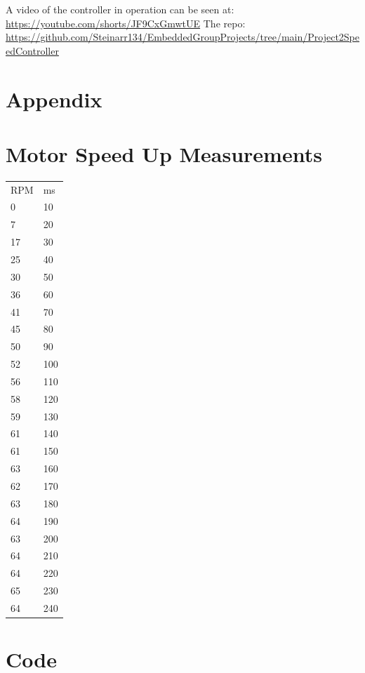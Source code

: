 \documentclass{article}
\begin{document}
A video of the controller in operation can be seen at: 
\url{https://youtube.com/shorts/JF9CxGmwtUE}
The repo: \url{https://github.com/Steinarr134/EmbeddedGroupProjects/tree/main/Project2SpeedController}

\newpage
\section*{Appendix}
\appendix
\section{Motor Speed Up Measurements}\label{appendix:motorspeedtable}

\begin{tabular}{ll}
RPM & ms \\
0           & 10        \\
7           & 20        \\
17          & 30        \\
25          & 40        \\
30          & 50        \\
36          & 60        \\
41          & 70        \\
45          & 80        \\
50          & 90        \\
52          & 100       \\
56          & 110       \\
58          & 120       \\
59          & 130       \\
61          & 140       \\
61          & 150       \\
63          & 160       \\
62          & 170       \\
63          & 180       \\
64          & 190       \\
63          & 200       \\
64          & 210       \\
64          & 220       \\
65          & 230       \\
64          & 240      
\end{tabular}

\newpage
\section{Code}\label{appendix:code}






\end{document}
